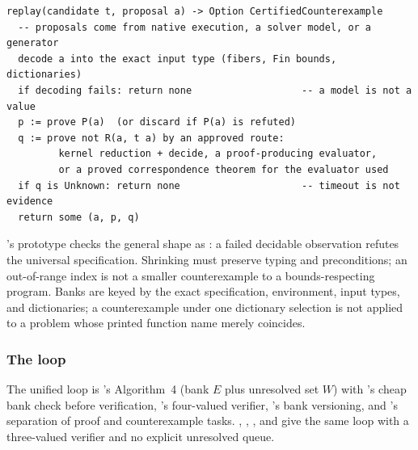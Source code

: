 \begin{lstlisting}
replay(candidate t, proposal a) -> Option CertifiedCounterexample
  -- proposals come from native execution, a solver model, or a generator
  decode a into the exact input type (fibers, Fin bounds, dictionaries)
  if decoding fails: return none                   -- a model is not a value
  p := prove P(a)  (or discard if P(a) is refuted)
  q := prove not R(a, t a) by an approved route:
         kernel reduction + decide, a proof-producing evaluator,
         or a proved correspondence theorem for the evaluator used
  if q is Unknown: return none                     -- timeout is not evidence
  return some (a, p, q)
\end{lstlisting}
's prototype checks the general shape as : a failed decidable observation refutes the universal specification. Shrinking must preserve typing and preconditions; an out-of-range index is not a smaller counterexample to a bounds-respecting program. Banks are keyed by the exact specification, environment, input types, and dictionaries; a counterexample under one dictionary selection is not applied to a problem whose printed function name merely coincides.

\subsubsection{The loop}

The unified loop is 's Algorithm~4 (bank $E$ plus unresolved set $W$) with 's cheap bank check before verification, 's four-valued verifier, 's bank versioning, and 's separation of proof and counterexample tasks. , , , and  give the same loop with a three-valued verifier and no explicit unresolved queue.


